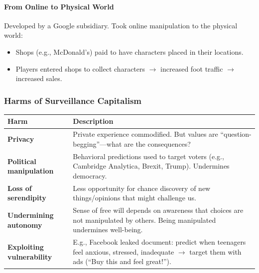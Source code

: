 \paragraph*{From Online to Physical World}

\begin{exbox}[Pokemon Go]
Developed by a Google subsidiary. Took online manipulation to the physical world:
\begin{itemize}
  \item Shops (e.g., McDonald's) paid to have characters placed in their locations.
  \item Players entered shops to collect characters $\to$ increased foot traffic $\to$ increased sales.
\end{itemize}
\end{exbox}

\separator

\subsubsection{Harms of Surveillance Capitalism}

\begin{center}
\renewcommand{\arraystretch}{1.3}
\begin{tabular}{@{} l p{9cm} @{}}
\toprule
\textbf{Harm} & \textbf{Description} \\
\midrule
\textbf{Privacy} & Private experience commodified. But values are ``question-begging''---what are the consequences? \\
\textbf{Political manipulation} & Behavioral predictions used to target voters (e.g., Cambridge Analytica, Brexit, Trump). Undermines democracy. \\
\textbf{Loss of serendipity} & Less opportunity for chance discovery of new things/opinions that might challenge us. \\
\textbf{Undermining autonomy} & Sense of free will depends on awareness that choices are not manipulated by others. Being manipulated undermines well-being. \\
\textbf{Exploiting vulnerability} & E.g., Facebook leaked document: predict when teenagers feel anxious, stressed, inadequate $\to$ target them with ads (``Buy this and feel great!''). \\
\bottomrule
\end{tabular}
\end{center}

